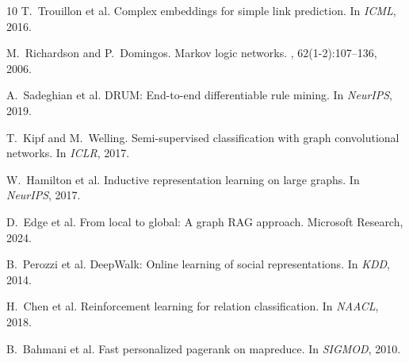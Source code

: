 \documentclass[10pt,twocolumn]{article}
\begin{document}
\begin{thebibliography}{10}
T.~Trouillon et al.
\newblock Complex embeddings for simple link prediction.
\newblock In {\em ICML}, 2016.

M.~Richardson and P.~Domingos.
\newblock Markov logic networks.
, 62(1-2):107--136, 2006.

A.~Sadeghian et al.
\newblock DRUM: End-to-end differentiable rule mining.
\newblock In {\em NeurIPS}, 2019.

T.~Kipf and M.~Welling.
\newblock Semi-supervised classification with graph convolutional networks.
\newblock In {\em ICLR}, 2017.

W.~Hamilton et al.
\newblock Inductive representation learning on large graphs.
\newblock In {\em NeurIPS}, 2017.

D.~Edge et al.
\newblock From local to global: A graph RAG approach.
\newblock Microsoft Research, 2024.

B.~Perozzi et al.
\newblock DeepWalk: Online learning of social representations.
\newblock In {\em KDD}, 2014.

H.~Chen et al.
\newblock Reinforcement learning for relation classification.
\newblock In {\em NAACL}, 2018.

B.~Bahmani et al.
\newblock Fast personalized pagerank on mapreduce.
\newblock In {\em SIGMOD}, 2010.

\end{thebibliography}
\end{document}
